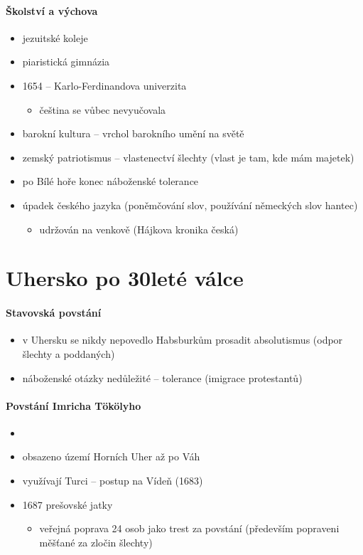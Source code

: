 \paragraph{Školství a výchova}
\begin{itemize}
\item jezuitské koleje
\item piaristická gimnázia
\item 1654 -- Karlo-Ferdinandova univerzita
	\begin{itemize}
	\item čeština se vůbec nevyučovala
	\end{itemize}
\item barokní kultura -- vrchol barokního umění na světě
\item zemský patriotismus -- vlastenectví šlechty (vlast je tam, kde mám majetek)
\item po Bílé hoře konec náboženské tolerance
\item úpadek českého jazyka (poněmčování slov, používání německých slov \ra hantec)
	\begin{itemize}
	\item udržován na venkově (Hájkova kronika česká)
	\end{itemize}
\end{itemize}

\section{Uhersko po 30leté válce}
\paragraph{Stavovská povstání}
\begin{itemize}
\item v Uhersku se nikdy nepovedlo Habsburkům prosadit absolutismus (odpor šlechty a poddaných)
\item náboženské otázky nedůležité -- tolerance (\ra imigrace protestantů)
\end{itemize}

\paragraph{Povstání Imricha Tökölyho}
\begin{itemize}
\item {}
\item obsazeno území Horních Uher až po Váh
\item využívají Turci -- postup na Vídeň (1683)
\item 1687 prešovské jatky
	\begin{itemize}
	\item veřejná poprava 24 osob jako trest za povstání (především popraveni měšťané za zločin šlechty)
	\end{itemize}
\end{itemize}

